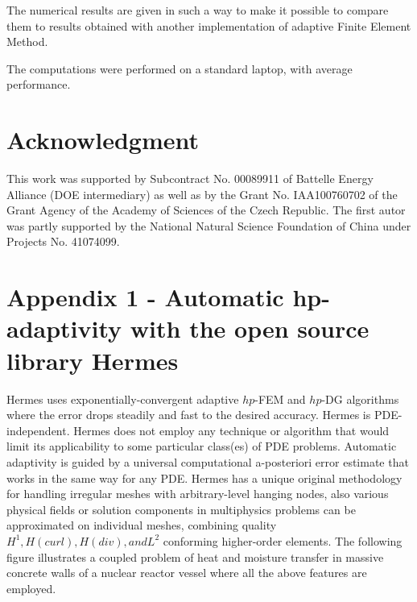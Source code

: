 \documentclass[12pt]{elsarticle}
\begin{document}
The numerical results are given in such a way to make it possible to compare them to results obtained with another implementation of adaptive Finite Element Method.

The computations were performed on a standard laptop, with average performance.

\section{Acknowledgment}

This work was supported by Subcontract No. 00089911 of Battelle
Energy Alliance (DOE intermediary) as well as by the
Grant No. IAA100760702 of the Grant Agency of the Academy
of Sciences of the Czech Republic. The first autor was partly
supported by the National Natural Science Foundation
of China under Projects No. 41074099.

\section{Appendix 1 - Automatic hp-adaptivity with the open source library Hermes}

Hermes uses exponentially-convergent adaptive $hp$-FEM and $hp$-DG algorithms where the error drops steadily and fast to the desired accuracy.
Hermes is PDE-independent. Hermes does not employ any technique or algorithm that would limit its applicability to some particular class(es) of PDE problems. Automatic adaptivity is guided by a universal computational a-posteriori error estimate that works in the same way for any PDE.
Hermes has a unique original methodology for handling irregular meshes with arbitrary-level hanging nodes, also various physical fields or solution components in multiphysics problems can be approximated on individual meshes, combining quality $H^1, H(curl), H(div), and L^2$ conforming higher-order elements. The following figure illustrates a coupled problem of heat and moisture transfer in massive concrete walls of a nuclear reactor vessel where all the above features are employed.
\end{document}
